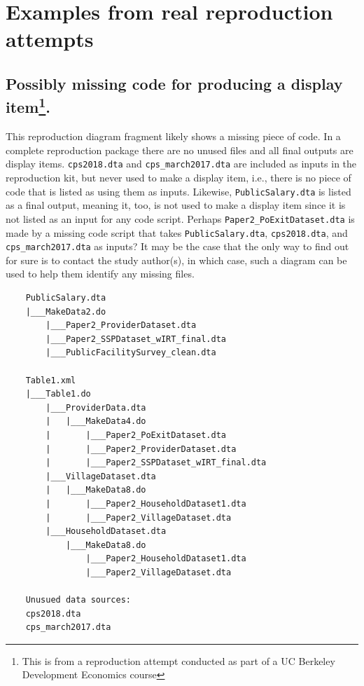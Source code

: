 \documentclass[]{book}
\begin{document}
\hypertarget{examples-from-real-reproduction-attempts}{%
\section{Examples from real reproduction attempts}\label{examples-from-real-reproduction-attempts}}

\hypertarget{possibly-missing-code-for-producing-a-display-item.}{%
\subsection[Possibly missing code for producing a display item.]{\texorpdfstring{Possibly missing code for producing a display item\footnote{This is from a reproduction attempt conducted as part of a UC Berkeley Development Economics course}.}{Possibly missing code for producing a display item.}}\label{possibly-missing-code-for-producing-a-display-item.}}

This reproduction diagram fragment likely shows a missing piece of code. In a complete reproduction package there are no unused files and all final outputs are display items. \texttt{cps2018.dta} and \texttt{cps\_march2017.dta} are included as inputs in the reproduction kit, but never used to make a display item, i.e., there is no piece of code that is listed as using them as inputs. Likewise, \texttt{PublicSalary.dta} is listed as a final output, meaning it, too, is not used to make a display item since it is not listed as an input for any code script. Perhaps \texttt{Paper2\_PoExitDataset.dta} is made by a missing code script that takes \texttt{PublicSalary.dta}, \texttt{cps2018.dta}, and \texttt{cps\_march2017.dta} as inputs? It may be the case that the only way to find out for sure is to contact the study author(s), in which case, such a diagram can be used to help them identify any missing files.

\begin{verbatim}
    PublicSalary.dta
    |___MakeData2.do
        |___Paper2_ProviderDataset.dta
        |___Paper2_SSPDataset_wIRT_final.dta
        |___PublicFacilitySurvey_clean.dta

    Table1.xml
    |___Table1.do
        |___ProviderData.dta
        |   |___MakeData4.do
        |       |___Paper2_PoExitDataset.dta
        |       |___Paper2_ProviderDataset.dta
        |       |___Paper2_SSPDataset_wIRT_final.dta
        |___VillageDataset.dta
        |   |___MakeData8.do
        |       |___Paper2_HouseholdDataset1.dta
        |       |___Paper2_VillageDataset.dta
        |___HouseholdDataset.dta
            |___MakeData8.do
                |___Paper2_HouseholdDataset1.dta
                |___Paper2_VillageDataset.dta

    Unusued data sources:
    cps2018.dta
    cps_march2017.dta  
\end{verbatim}
\end{document}
